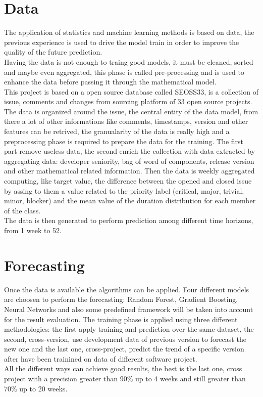 \documentclass{article}
\begin{document}
\section{Data}
The application of statistics and machine learning methods is based on data, the previous experience is used to drive the model train in order to improve the quality of the future prediction.\\
Having the data is not enough to traing good models, it must be cleaned, sorted and maybe even aggregated, this phase is called pre-processing and is used to enhance the data before passing it through the mathematical model.\\
This project is based on a open source database called SEOSS33, is a collection of issue, comments and changes from sourcing platform of 33 open source projects. The data is organized around the issue, the central entity of the data model, from there a lot of other informations like comments, timestamps, version and other features can be retrived, the granualarity of the data is really high and a preprocessing phase is required to prepare the data for the training. The first part remove useless data, the second enrich the collection with data extracted by aggregating data: developer seniority, bag of word of components, release version and other mathematical related information. Then the data is weekly aggregated computing, like target value, the difference between the opened and closed issue by assing to them a value related to the priority label (critical, major, trivial, minor, blocker) and the mean value of the duration distribution for each member of the class.\\
The data is then generated to perform prediction among different time horizons, from 1 week to 52.

\section{Forecasting}
Once the data is available the algorithms can be applied. Four different models are choosen to perform the forecasting: Random Forest, Gradient Boosting, Neural Networks and also some predefined framework will be taken into account for the result evaluation. The training phase is applied using three different methodologies: the first apply training and prediction over the same dataset, the second, cross-version, use development data of previous version to forecast the new one and the last one, cross-project, predict the trend of a specific version after have been trainined on data of different software project.\\
All the different ways can achieve good results, the best is the last one, cross project with a precision greater than 90\% up to 4 weeks and still greater than 70\% up to 20 weeks. 
\end{document}
